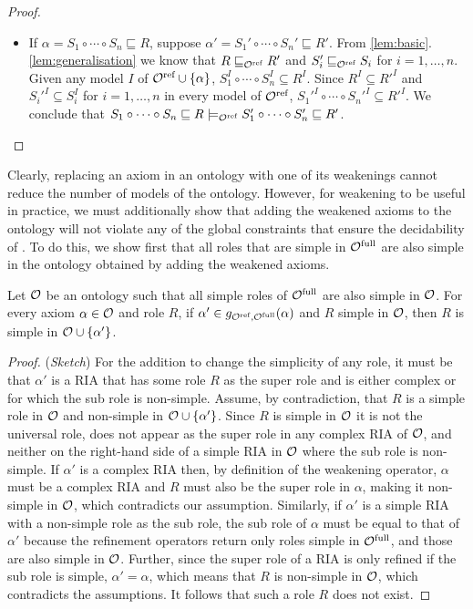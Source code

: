 \begin{proof}
\begin{itemize}
    \item If $\alpha = S_1 \circ \cdots \circ S_n \sqsubseteq R$, suppose $\alpha' = S_1' \circ \cdots \circ S_n' \sqsubseteq R'$. From \cref{lem:basic}.\ref{lem:generalisation} we know that $R \sqsubseteq_{\mathcal{O}^\textnormal{ref}} R'$ and $S_i' \sqsubseteq_{\mathcal{O}^\textnormal{ref}} S_i$ for $i = 1, \dots, n$. Given any model $I$ of ${\mathcal{O}^\textnormal{ref}} \cup \{ \alpha \}$, $S_1^I \circ \cdots \circ S_n^I \subseteq R^I$. Since $R^I \subseteq R'^I$ and $S_i'^I \subseteq S_i^I$ for $i = 1, \dots, n$ in every model of ${\mathcal{O}^\textnormal{ref}}$, $S_1'^I \circ \cdots \circ S_n'^I \subseteq R'^I$. We conclude that $S_1 \circ \cdots \circ S_n \sqsubseteq R \models_{\mathcal{O}^\textnormal{ref}} S_1' \circ \cdots \circ S_n' \sqsubseteq R'$.
  \end{itemize}
\end{proof}

Clearly, replacing an axiom in an ontology with one of its weakenings cannot reduce the number of models of the ontology. However, for weakening to be useful in practice, we must additionally show that adding the weakened axioms to the ontology will not violate any of the global constraints that ensure the decidability of \SROIQ. To do this, we show first that all roles that are simple in ${\mathcal{O}^\textnormal{full}}$ are also simple in the ontology obtained by adding the weakened axioms.

\begin{lemma} \label{lem:simple-roles}
  Let $\mathcal{O}$ be an ontology such that all simple roles of ${\mathcal{O}^\textnormal{full}}$ are also simple in $\mathcal{O}$. For every axiom $\alpha \in \mathcal{O}$ and role $R$, if $\alpha' \in g_{{\mathcal{O}^\textnormal{ref}},{\mathcal{O}^\textnormal{full}}}(\alpha)$ and $R$ simple in $\mathcal{O}$, then $R$ is simple in $\mathcal{O} \cup \{ \alpha' \}$.
\end{lemma}

\begin{proof}(\emph{Sketch})
  For the addition to change the simplicity of any role, it must be that $\alpha'$ is a RIA that has some role $R$ as the super role and is either complex or for which the sub role is non-simple. Assume, by contradiction, that $R$ is a simple role in $\mathcal{O}$ and non-simple in $\mathcal{O} \cup \{ \alpha' \}$. Since $R$ is simple in $\mathcal{O}$ it is not the universal role, does not appear as the super role in any complex RIA of $\mathcal{O}$, and neither on the right-hand side of a simple RIA in $\mathcal{O}$ where the sub role is non-simple. If $\alpha'$ is a complex RIA then, by definition of the weakening operator, $\alpha$ must be a complex RIA and $R$ must also be the super role in $\alpha$, making it non-simple in $\mathcal{O}$, which contradicts our assumption. Similarly, if $\alpha'$ is a simple RIA with a non-simple role as the sub role, the sub role of $\alpha$ must be equal to that of $\alpha'$ because the refinement operators return only roles simple in ${\mathcal{O}^\textnormal{full}}$, and those are also simple in $\mathcal{O}$. Further, since the super role of a RIA is only refined if the sub role is simple, $\alpha' = \alpha$, which means that $R$ is non-simple in $\mathcal{O}$, which contradicts the assumptions. It follows that such a role $R$ does not exist.
\end{proof}

